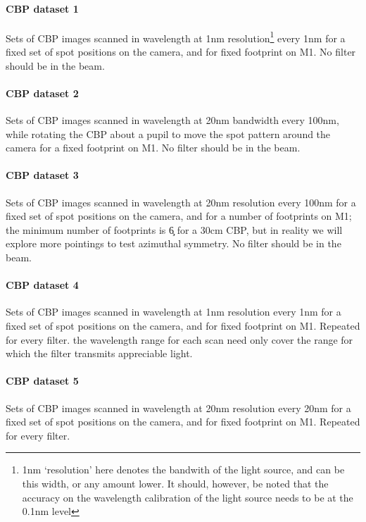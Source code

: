 \paragraph{CBP dataset 1}\label{sec:CPP:inputs:CBP:mono}
Sets of CBP images scanned in wavelength at 1nm resolution\footnote{1nm `resolution' here denotes the bandwith of the light source, and can be this width, or any amount lower. It should, however, be noted that the accuracy on the wavelength calibration of the light source needs to be at the 0.1nm level } every 1nm for a fixed set of spot positions on the camera, and for fixed footprint on M1. No filter should be in the beam.
	
	
\paragraph{CBP dataset 2}\label{sec:CPP:inputs:CBP:spot}
Sets of CBP images scanned in wavelength at 20nm bandwidth every 100nm, while rotating the CBP about a pupil to move the spot pattern around the camera for a fixed footprint on M1. No filter should be in the beam.

	
\paragraph{CBP dataset 3}\label{sec:CPP:inputs:CBP:M1}
Sets of CBP images scanned in wavelength at 20nm resolution every 100nm for a fixed set of spot positions on the camera, and for a number of footprints on M1; the minimum number of footprints is \c 6 for a 30cm CBP, but in reality we will explore more pointings to test azimuthal symmetry. No filter should be in the beam.


\paragraph{CBP dataset 4}\label{sec:CPP:inputs:CBP:filter}
Sets of CBP images scanned in wavelength at 1nm resolution every 1nm for a fixed set of spot positions on the camera, and for fixed footprint on M1. Repeated for every filter. \Nb the wavelength range for each scan need only cover the range for which the filter transmits appreciable light.


\paragraph{CBP dataset 5}\label{sec:CPP:inputs:CBP:leak}
Sets of CBP images scanned in wavelength at 20nm resolution every 20nm for a fixed set of spot positions on the camera, and for fixed footprint on M1. Repeated for every filter.


